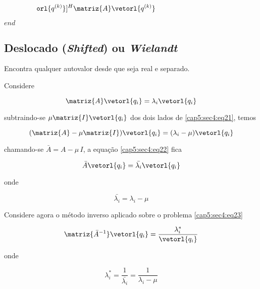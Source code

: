 \begin{equation}
 \hspace*{-5.4cm}
 \lambda_N^{(k)} = [\vetorl{q^{(k)}}]^H \matriz{A} \vetorl{q^{(k)}}
\end{equation}

\hspace*{1cm}
$
end
$

\subsection{Deslocado (\textit{Shifted}) ou \textit{Wielandt}}

Encontra qualquer autovalor desde que seja real e separado.

Considere

\begin{equation}
 \label{cap5:sec4:eq21}
 \matriz{A} \vetorl{q_i} = \lambda_i \vetorl{q_i}
\end{equation}

subtraindo-se $ \mu \matriz{I} \vetorl{q_i} $ dos dois lados de \ref{cap5:sec4:eq21}, temos

\begin{equation}
 \label{cap5:sec4:eq22}
 (\matriz{A} - \mu \matriz{I}) \vetorl{q_i} = (\lambda_i - \mu) \vetorl{q_i}
\end{equation}

chamando-se $ \bar{A} = A - \mu \, I $, a equação \ref{cap5:sec4:eq22} fica

\begin{equation}
 \label{cap5:sec4:eq23}
 \bar{A} \vetorl{q_i} = \bar{\lambda_i} \vetorl{q_i}
\end{equation}

onde

\begin{equation}
 \label{cap5:sec4:eq24}
 \bar{\lambda_i} = \lambda_i - \mu
\end{equation}

Considere agora o método inverso aplicado sobre o problema \ref{cap5:sec4:eq23}

\begin{equation}
 \label{cap5:sec4:eq25}
 \matriz{\bar{A}^{-1}} \vetorl{q_i} = \frac{\lambda_i^*}{\vetorl{q_i}}
\end{equation}

onde

\begin{equation}
 \label{cap5:sec4:eq26}
 \lambda_i^* = \frac{1}{\bar{\lambda_i}} = \frac{1}{\lambda_i - \mu}
\end{equation}

